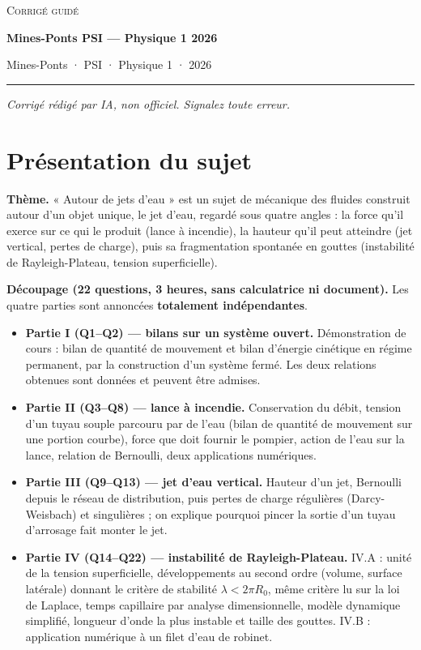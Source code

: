 \documentclass[11pt,a4paper]{article}
\providecommand{\tightlist}{\setlength{\itemsep}{0pt}\setlength{\parskip}{0pt}}
\begin{document}
\thispagestyle{plain}
\begin{center}
  {\small\scshape Corrigé guidé}\par\smallskip
  {\LARGE\bfseries Mines-Ponts PSI — Physique 1 2026\par}\medskip
  {\large Mines-Ponts · PSI · Physique 1 · 2026\par}
\end{center}
\vspace{2pt}\hrule\vspace{8pt}

\emph{Corrigé rédigé par IA, non officiel. Signalez toute erreur.}

\hypertarget{pruxe9sentation-du-sujet}{%
\section{Présentation du sujet}\label{pruxe9sentation-du-sujet}}

\textbf{Thème.} « Autour de jets d'eau » est un sujet de mécanique des fluides construit autour d'un objet unique, le jet d'eau, regardé sous quatre angles : la force qu'il exerce sur ce qui le produit (lance à incendie), la hauteur qu'il peut atteindre (jet vertical, pertes de charge), puis sa fragmentation spontanée en gouttes (instabilité de Rayleigh-Plateau, tension superficielle).

\textbf{Découpage (22 questions, 3 heures, sans calculatrice ni document).} Les quatre parties sont annoncées \textbf{totalement indépendantes}.

\begin{itemize}
\tightlist
\item
  \textbf{Partie I (Q1--Q2) --- bilans sur un système ouvert.} Démonstration de cours : bilan de quantité de mouvement et bilan d'énergie cinétique en régime permanent, par la construction d'un système fermé. Les deux relations obtenues sont données et peuvent être admises.
\item
  \textbf{Partie II (Q3--Q8) --- lance à incendie.} Conservation du débit, tension d'un tuyau souple parcouru par de l'eau (bilan de quantité de mouvement sur une portion courbe), force que doit fournir le pompier, action de l'eau sur la lance, relation de Bernoulli, deux applications numériques.
\item
  \textbf{Partie III (Q9--Q13) --- jet d'eau vertical.} Hauteur d'un jet, Bernoulli depuis le réseau de distribution, puis pertes de charge régulières (Darcy-Weisbach) et singulières ; on explique pourquoi pincer la sortie d'un tuyau d'arrosage fait monter le jet.
\item
  \textbf{Partie IV (Q14--Q22) --- instabilité de Rayleigh-Plateau.} IV.A : unité de la tension superficielle, développements au second ordre (volume, surface latérale) donnant le critère de stabilité \(\lambda<2\pi R_0\), même critère lu sur la loi de Laplace, temps capillaire par analyse dimensionnelle, modèle dynamique simplifié, longueur d'onde la plus instable et taille des gouttes. IV.B : application numérique à un filet d'eau de robinet.
\end{itemize}
\end{document}
